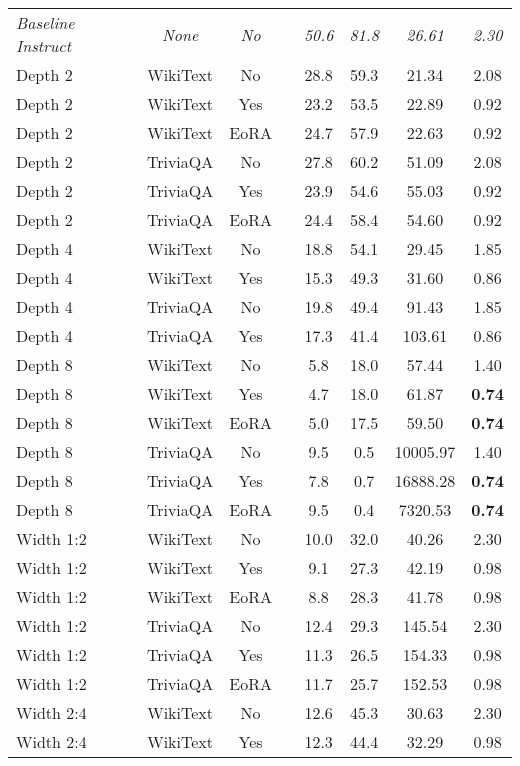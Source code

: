 \begin{longtable}{lcclcccc}
\hline
\endlastfoot
\textit{Baseline Instruct} & \textit{None} & \textit{No} & & \textit{50.6} & \textit{81.8} & \textit{26.61} & \textit{2.30} \\
Depth 2 & WikiText & No & & 28.8 & 59.3 & 21.34 & 2.08 \\
Depth 2 & WikiText & Yes & & 23.2 & 53.5 & 22.89 & 0.92 \\
Depth 2 & WikiText & EoRA & & 24.7 & 57.9 & 22.63 & 0.92 \\
Depth 2 & TriviaQA & No & & 27.8 & 60.2 & 51.09 & 2.08 \\
Depth 2 & TriviaQA & Yes & & 23.9 & 54.6 & 55.03 & 0.92 \\
Depth 2 & TriviaQA & EoRA & & 24.4 & 58.4 & 54.60 & 0.92 \\
Depth 4 & WikiText & No & & 18.8 & 54.1 & 29.45 & 1.85 \\
Depth 4 & WikiText & Yes & & 15.3 & 49.3 & 31.60 & 0.86 \\
Depth 4 & TriviaQA & No & & 19.8 & 49.4 & 91.43 & 1.85 \\
Depth 4 & TriviaQA & Yes & & 17.3 & 41.4 & 103.61 & 0.86 \\
Depth 8 & WikiText & No & & 5.8 & 18.0 & 57.44 & 1.40 \\
Depth 8 & WikiText & Yes & & 4.7 & 18.0 & 61.87 & \textbf{0.74} \\
Depth 8 & WikiText & EoRA & & 5.0 & 17.5 & 59.50 & \textbf{0.74} \\
Depth 8 & TriviaQA & No & & 9.5 & 0.5 & 10005.97 & 1.40 \\
Depth 8 & TriviaQA & Yes & & 7.8 & 0.7 & 16888.28 & \textbf{0.74} \\
Depth 8 & TriviaQA & EoRA & & 9.5 & 0.4 & 7320.53 & \textbf{0.74} \\
Width 1:2 & WikiText & No & & 10.0 & 32.0 & 40.26 & 2.30 \\
Width 1:2 & WikiText & Yes & & 9.1 & 27.3 & 42.19 & 0.98 \\
Width 1:2 & WikiText & EoRA & & 8.8 & 28.3 & 41.78 & 0.98 \\
Width 1:2 & TriviaQA & No & & 12.4 & 29.3 & 145.54 & 2.30 \\
Width 1:2 & TriviaQA & Yes & & 11.3 & 26.5 & 154.33 & 0.98 \\
Width 1:2 & TriviaQA & EoRA & & 11.7 & 25.7 & 152.53 & 0.98 \\
Width 2:4 & WikiText & No & & 12.6 & 45.3 & 30.63 & 2.30 \\
Width 2:4 & WikiText & Yes & & 12.3 & 44.4 & 32.29 & 0.98 \\

\end{longtable}

